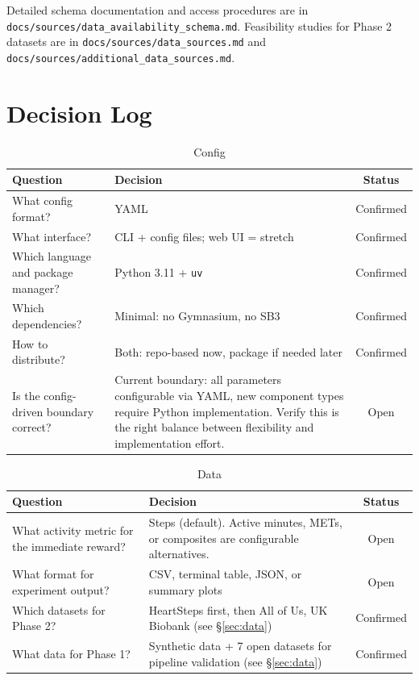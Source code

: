 \documentclass[11pt,a4paper]{article}
\begin{document}
Detailed schema documentation and access procedures are in \texttt{docs/sources/data\_availability\_schema.md}. Feasibility studies for Phase 2 datasets are in \texttt{docs/sources/data\_sources.md} and \texttt{docs/sources/additional\_data\_sources.md}.

\section{Decision Log}
\label{sec:decisions}

\begin{table}[H]
\centering
\caption{Config}
\begin{tabular}{p{}p{}c}
\toprule
Question & Decision & Status \\
\midrule
What config format? & YAML & Confirmed \\
What interface? & CLI + config files; web UI = stretch & Confirmed \\
Which language and package manager? & Python 3.11 + \texttt{uv} & Confirmed \\
Which dependencies? & Minimal: no Gymnasium, no SB3 & Confirmed \\
How to distribute? & Both: repo-based now, package if needed later & Confirmed \\
\midrule
Is the config-driven boundary correct? & Current boundary: all parameters configurable via YAML, new component types require Python implementation. Verify this is the right balance between flexibility and implementation effort. & Open \\
\bottomrule
\end{tabular}
\end{table}

\begin{table}[H]
\centering
\caption{Data}
\begin{tabular}{p{}p{}c}
\toprule
Question & Decision & Status \\
\midrule
What activity metric for the immediate reward? & Steps (default). Active minutes, METs, or composites are configurable alternatives. & Open \\
What format for experiment output? & CSV, terminal table, JSON, or summary plots & Open \\
Which datasets for Phase 2? & HeartSteps first, then All of Us, UK Biobank (see \S\ref{sec:data}) & Confirmed \\
What data for Phase 1? & Synthetic data + 7 open datasets for pipeline validation (see \S\ref{sec:data}) & Confirmed \\
\bottomrule
\end{tabular}
\end{table}
\end{document}
